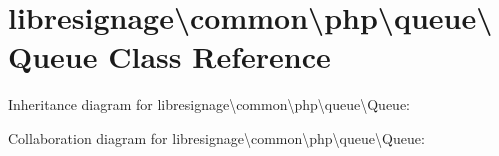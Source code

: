 \hypertarget{classlibresignage_1_1common_1_1php_1_1queue_1_1Queue}{}\section{libresignage\textbackslash{}common\textbackslash{}php\textbackslash{}queue\textbackslash{}Queue Class Reference}
\label{classlibresignage_1_1common_1_1php_1_1queue_1_1Queue}


Inheritance diagram for libresignage\textbackslash{}common\textbackslash{}php\textbackslash{}queue\textbackslash{}Queue\+:


Collaboration diagram for libresignage\textbackslash{}common\textbackslash{}php\textbackslash{}queue\textbackslash{}Queue\+:
